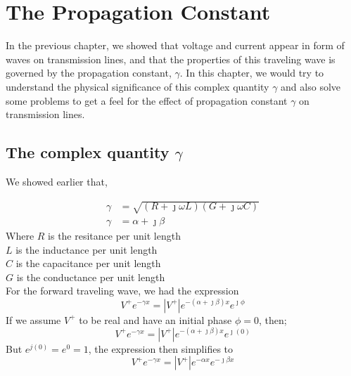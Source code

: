 \chapter{The Propagation Constant}
	In the previous chapter, we showed that voltage and current appear in form of waves on transmission lines, and that the properties of this traveling wave is governed by the propagation constant, $\gamma$. In this chapter, we would try to understand the physical significance of this complex quantity $\gamma$ and also solve some problems to get a feel for the effect of propagation constant $\gamma$ on transmission lines.

\section{The complex quantity $\gamma$}We showed earlier that,

\begin{align*}
\gamma &= \sqrt{(R + \jmath\omega L)(G + \jmath\omega C)} \\
\gamma & = \alpha + \jmath\beta
\end{align*}
Where $R$ is the resitance per unit length\\

\hspace{13pt}$L$ is the inductance per unit length\\
	  
\hspace{13pt}$C$ is the capacitance per unit length\\
	  
\hspace{13pt}$G$ is the conductance per unit length\\ 
For the forward traveling wave, we had the expression
\begin{equation}
V^+e^{-\gamma x} =\left|  V^+\right| e^{-(\alpha + \jmath\beta)x}e^{\jmath\phi}
\end{equation}
If we assume $V^+$ to be real and have an initial phase $\phi = 0$, then;
\begin{equation*}
V^+e^{-\gamma x} = \left| V^+\right| e^{-(\alpha + \jmath\beta)x}e^{\jmath (0)}
\end{equation*}
But $ e^{j(0)} = e^0 = 1 $, the expression then simplifies to
\begin{equation}
V^+e^{-\gamma x} = \left| V^+\right| e^{-\alpha x}e^{-\jmath\beta x}
\label{eqn3.2}
\end{equation}
